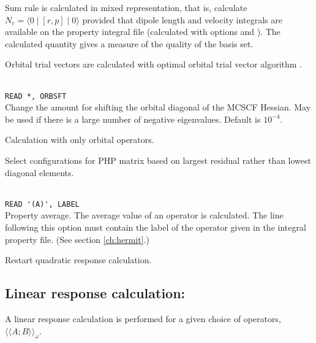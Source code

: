 \begin{description}
\item{}
Sum rule is calculated in mixed representation, that is, calculate
$N_e=\langle0\mid [r,p] \mid0\rangle$ provided that dipole length and
velocity integrals are available on the property integral file 
(calculated with  options  and ).
The calculated quantity gives a measure of the quality of the basis
set.

\item{}
Orbital trial vectors are calculated with optimal orbital
trial vector
algorithm \cite{tuhjahjajpjjcp84}.

\item{}\\
\verb|READ *, ORBSFT|\\
Change the amount for shifting the orbital
diagonal of the MCSCF Hessian.
May be used if there is a large number of negative eigenvalues.
Default is $10^{-4}$. 

\item{}
Calculation with only orbital operators. 

\item{}
Select configurations for PHP matrix based on largest residual
rather than lowest diagonal elements.

\item{} \\
\verb|READ '(A)', LABEL|\\
Property average. The average value of an
operator is calculated. 
The line following this option must contain the
label of the operator given in the integral property file.
(See section \ref{ch:hermit}.)

\item{}
Restart quadratic response
calculation.
\end{description}

\subsection{Linear response calculation: }

A linear response
\cite{jodlypjjcp91,pjhjajjojcp89} calculation is performed for a given
choice of operators,
$\langle\!\langle A; B \rangle\!\rangle_{\omega}$.

